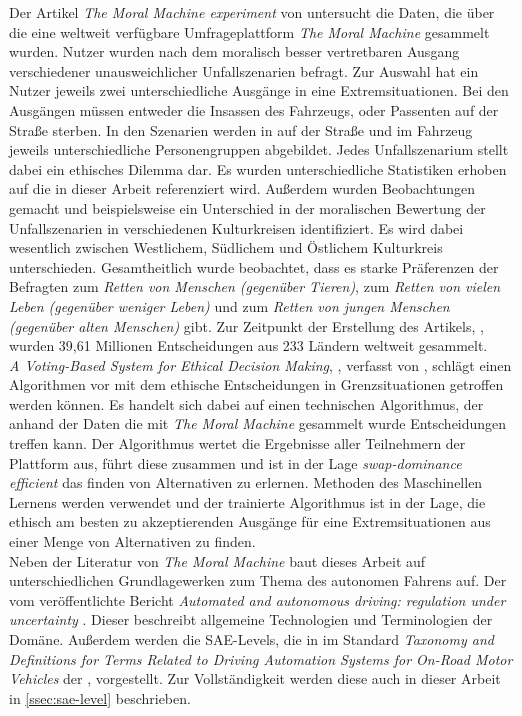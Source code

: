 Der Artikel \textit{The Moral Machine experiment} \cite{moralMachine} von \citeauthor{moralMachine} untersucht die Daten, die über die eine weltweit verfügbare Umfrageplattform \textit{The Moral Machine} gesammelt wurden. Nutzer wurden nach dem moralisch besser vertretbaren Ausgang verschiedener unausweichlicher Unfallszenarien befragt. Zur Auswahl hat ein Nutzer jeweils zwei unterschiedliche Ausgänge in eine Extremsituationen. Bei den Ausgängen müssen entweder die Insassen des Fahrzeugs, oder Passenten auf der Straße sterben. In den Szenarien werden in auf der Straße und im Fahrzeug jeweils unterschiedliche Personengruppen abgebildet. Jedes Unfallszenarium stellt dabei ein ethisches Dilemma dar. Es wurden unterschiedliche Statistiken erhoben auf die in dieser Arbeit referenziert wird. Außerdem wurden Beobachtungen gemacht und beispielsweise ein Unterschied in der moralischen Bewertung der Unfallszenarien in verschiedenen Kulturkreisen identifiziert. Es wird dabei wesentlich zwischen Westlichem, Südlichem und Östlichem Kulturkreis unterschieden. Gesamtheitlich wurde beobachtet, dass es starke Präferenzen der Befragten zum \textit{Retten von Menschen (gegenüber Tieren)}, zum \textit{Retten von vielen Leben (gegenüber weniger Leben)} und zum \textit{Retten von jungen Menschen (gegenüber alten Menschen)} gibt. Zur Zeitpunkt der Erstellung des Artikels, \citeyear{moralMachine}, wurden 39,61 Millionen Entscheidungen aus 233 Ländern weltweit gesammelt. \\

\textit{A Voting-Based System for Ethical Decision Making}, \cite{votingBasedSystem}, verfasst von \citeauthor{votingBasedSystem}, schlägt einen Algorithmen vor mit dem ethische Entscheidungen in Grenzsituationen getroffen werden können. Es handelt sich dabei auf einen technischen Algorithmus, der anhand der Daten die mit \textit{The Moral Machine} gesammelt wurde Entscheidungen treffen kann. Der Algorithmus wertet die Ergebnisse aller Teilnehmern der Plattform aus, führt diese zusammen und ist in der Lage  \textit{swap-dominance efficient} das finden von Alternativen zu erlernen. Methoden des Maschinellen Lernens werden verwendet und der trainierte Algorithmus ist in der Lage, die ethisch am besten zu akzeptierenden Ausgänge für eine Extremsituationen aus einer Menge von Alternativen zu finden.\\

Neben der Literatur von \textit{The Moral Machine} baut dieses Arbeit auf unterschiedlichen Grundlagewerken zum Thema des autonomen Fahrens auf. Der vom \citeauthor{smith2015automated} veröffentlichte Bericht \textit{Automated and
autonomous driving: regulation under uncertainty} \cite{smith2015automated}. Dieser beschreibt allgemeine Technologien und Terminologien der Domäne. Außerdem werden die SAE-Levels, die in im Standard \textit{Taxonomy and Definitions for Terms Related to Driving Automation Systems for On-Road Motor Vehicles} \cite{standardSAE} der \citeauthor{standardSAE}, vorgestellt. Zur Vollständigkeit werden diese auch in dieser Arbeit in \ref{ssec:sae-level} beschrieben.\\
